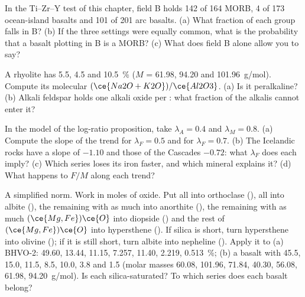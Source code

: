 \begin{exercise}[$\star\star$]\label{exo:b2:magmatic-series:8}
In the Ti--Zr--Y test of this chapter, field B holds 142 of 164 MORB, 4 of 173
ocean-island basalts and 101 of 201 arc basalts. (a) What fraction of each group falls
in B? (b) If the three settings were equally common, what is the probability that a
basalt plotting in B is a MORB? (c) What does field B alone allow you to say?
\end{exercise}

\begin{exercise}[$\star\star$]\label{exo:b2:magmatic-series:9}
A rhyolite has  5.5,  4.5 and  \qty{10.5}{\percent} ($M$ =
61.98, 94.20 and \qty{101.96}{g/mol}). Compute its molecular $(\ce{Na2O +
K2O})/\ce{Al2O3}$. (a) Is it peralkaline? (b) Alkali feldspar holds one
alkali oxide per : what fraction of the alkalis cannot enter it?
\end{exercise}

\begin{exercise}[$\star\star\star$]\label{exo:b2:magmatic-series:10}
In the model of the log-ratio proposition, take $\lambda_A = 0.4$ and $\lambda_M =
0.8$. (a) Compute the slope of the trend for $\lambda_F = 0.5$ and for $\lambda_F =
0.7$. (b) The Icelandic rocks have a slope of $-1.10$ and those of the Cascades
$-0.72$: what $\lambda_F$ does each imply? (c) Which series loses its iron faster,
and which mineral explains it? (d) What happens to $F/M$ along each trend?
\end{exercise}

\begin{exercise}[$\star\star\star$]\label{exo:b2:magmatic-series:11}
A simplified norm. Work in moles of oxide. Put all  into orthoclase
(), all  into albite (), the
remaining  with as much  into anorthite (), the
remaining  with as much $(\ce{Mg,Fe})\ce{O}$ into diopside
() and the rest of $(\ce{Mg,Fe})\ce{O}$ into hypersthene
(). If silica is short, turn hypersthene into olivine
(); if it is still short, turn albite into nepheline
(). Apply it to (a) BHVO-2:  49.60,  13.44,
 11.15,  7.257,  11.40,  2.219, 
\qty{0.513}{\percent}; (b) a basalt with 45.5, 15.0, 11.5, 8.5, 10.0, 3.8 and 1.5 (molar
masses  60.08,  101.96,  71.84,  40.30, 
56.08,  61.98,  \qty{94.20}{g/mol}). Is each silica-saturated? To
which series does each basalt belong?
\end{exercise}

